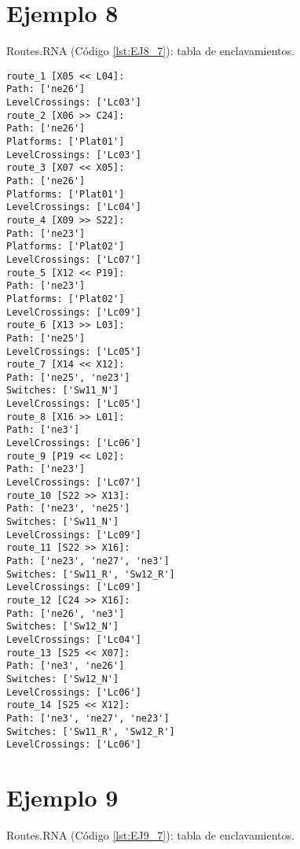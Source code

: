 	\section{Ejemplo 8}
	Routes.RNA (Código \ref{lst:EJ8_7}): tabla de enclavamientos.
	
	\begin{lstlisting}[language = {}, caption = Routes.RNA, label = {lst:EJ8_7}]
route_1 [X05 << L04]:
Path: ['ne26']
LevelCrossings: ['Lc03']
route_2 [X06 >> C24]:
Path: ['ne26']
Platforms: ['Plat01']
LevelCrossings: ['Lc03']
route_3 [X07 << X05]:
Path: ['ne26']
Platforms: ['Plat01']
LevelCrossings: ['Lc04']
route_4 [X09 >> S22]:
Path: ['ne23']
Platforms: ['Plat02']
LevelCrossings: ['Lc07']
route_5 [X12 << P19]:
Path: ['ne23']
Platforms: ['Plat02']
LevelCrossings: ['Lc09']
route_6 [X13 >> L03]:
Path: ['ne25']
LevelCrossings: ['Lc05']
route_7 [X14 << X12]:
Path: ['ne25', 'ne23']
Switches: ['Sw11_N']
LevelCrossings: ['Lc05']
route_8 [X16 >> L01]:
Path: ['ne3']
LevelCrossings: ['Lc06']
route_9 [P19 << L02]:
Path: ['ne23']
LevelCrossings: ['Lc07']
route_10 [S22 >> X13]:
Path: ['ne23', 'ne25']
Switches: ['Sw11_N']
LevelCrossings: ['Lc09']
route_11 [S22 >> X16]:
Path: ['ne23', 'ne27', 'ne3']
Switches: ['Sw11_R', 'Sw12_R']
LevelCrossings: ['Lc09']
route_12 [C24 >> X16]:
Path: ['ne26', 'ne3']
Switches: ['Sw12_N']
LevelCrossings: ['Lc04']
route_13 [S25 << X07]:
Path: ['ne3', 'ne26']
Switches: ['Sw12_N']
LevelCrossings: ['Lc06']
route_14 [S25 << X12]:
Path: ['ne3', 'ne27', 'ne23']
Switches: ['Sw11_R', 'Sw12_R']
LevelCrossings: ['Lc06']
	\end{lstlisting}	
	\section{Ejemplo 9}
	Routes.RNA (Código \ref{lst:EJ9_7}): tabla de enclavamientos.
	

